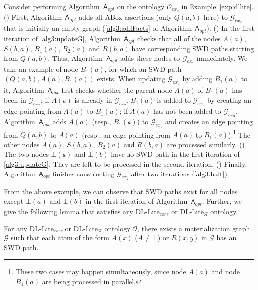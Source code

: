 \documentclass[final,1p,times]{elsarticle}
\begin{document}
Consider performing Algorithm~$\mathsf{A}_{opt}$ on the ontology $\mathcal{O}_{ex_2}$ in Example~\ref{exp:dllite}.
(\uppercase\expandafter{}) First, Algorithm~$\mathsf{A}_{opt}$ adds all ABox assertions (only $Q(a,b)$ here)
to $\mathcal{G}_{ex_2}$ that is initially an empty graph (\ref{alg3:addFacts} of Algorithm~$\mathsf{A}_{opt}$).
(\uppercase\expandafter{}) In the first iteration of
\ref{alg3:updateG}, Algorithm~$\mathsf{A}_{opt}$ checks that all of the nodes
$A(a)$, $S(b,a)$, $B_1(a)$, $B_2(a)$ and $R(b,a)$ have corresponding SWD paths
starting from $Q(a,b)$. Thus, Algorithm~$\mathsf{A}_{opt}$
adds these nodes to $\mathcal{G}_{ex_2}$ immediately. We take an example of node $B_1(a)$,
for which an SWD path $(Q(a,b),A(a),B_1(a))$ exists.
When updating $\mathcal{G}_{ex_2}$ by adding $B_1(a)$ to it,
Algorithm~$\mathsf{A}_{opt}$ first checks whether the parent node $A(a)$ of $B_1(a)$
has been in $\mathcal{G}_{ex_2}$; if $A(a)$ is already in $\mathcal{G}_{ex_2}$, $B_1(a)$
is added to $\mathcal{G}_{ex_2}$ by creating an edge pointing from $A(a)$ to $B_1(a)$;
if $A(a)$ has not been added to $\mathcal{G}_{ex_2}$, Algorithm~$\mathsf{A}_{opt}$ adds $A(a)$ (resp., $B_1(a)$)
to $\mathcal{G}_{ex_2}$ and creates an edge pointing from $Q(a,b)$ to $A(a)$ (resp.,
an edge pointing from $A(a)$ to $B_1(a)$).\footnote{These two cases may happen simultaneously,
since node $A(a)$ and node $B_1(a)$ are being processed in parallel.} The other nodes
$A(a)$, $S(b,a)$, $B_2(a)$ and $R(b,a)$ are processed similarly.
(\uppercase\expandafter{})
The two nodes $\bot(a)$ and $\bot(b)$
have no SWD path in the first iteration of \ref{alg3:updateG}.
They are left to be processed in the second iteration.
(\uppercase\expandafter{})
Finally, Algorithm~$\mathsf{A}_{opt}$ finishes constructing $\mathcal{G}_{ex_2}$
after two iterations (\ref{alg3:halt}).

From the above example, we can observe that SWD paths exist
for all nodes except $\bot(a)$ and $\bot(b)$ in the first iteration of Algorithm~$\mathsf{A}_{opt}$.
Further, we give the following lemma that satisfies any DL-Lite$_{core}$ or DL-Lite$_\mathcal{R}$ ontology.

\begin{lemma}\label{lemma:dllite}
For any DL-Lite$_{core}$ or DL-Lite$_\mathcal{R}$ ontology $\mathcal{O}$, there exists a materialization graph $\mathcal{G}$ such that
each atom of the form $A(x)$ ($A\neq\bot$) or $R(x,y)$ in $\mathcal{G}$ has an SWD path.
\end{lemma}
\end{document}
